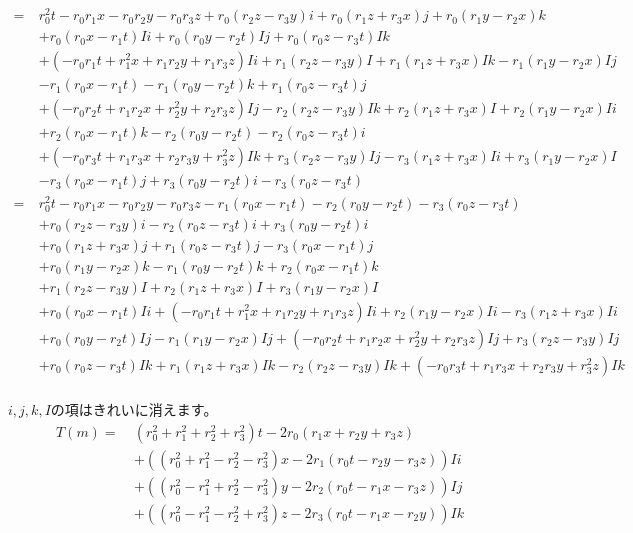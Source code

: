 \documentclass[a4paper,12pt,notitlepage]{jsreport}
\begin{document}
\begin{equation}
  \begin{split}
    =~&r_0^2t-r_0r_1x-r_0r_2y-r_0r_3z+r_0(r_2z-r_3y)i+r_0(r_1z+r_3x)j+r_0(r_1y-r_2x)k\\
    &+r_0(r_0x-r_1t)Ii+r_0(r_0y-r_2t)Ij+r_0(r_0z-r_3t)Ik\\
    &+(-r_0r_1t+r_1^2x+r_1r_2y+r_1r_3z)Ii+r_1(r_2z-r_3y)I+r_1(r_1z+r_3x)Ik-r_1(r_1y-r_2x)Ij\\
    &-r_1(r_0x-r_1t)-r_1(r_0y-r_2t)k+r_1(r_0z-r_3t)j\\
    &+(-r_0r_2t+r_1r_2x+r_2^2y+r_2r_3z)Ij-r_2(r_2z-r_3y)Ik+r_2(r_1z+r_3x)I+r_2(r_1y-r_2x)Ii\\
    &+r_2(r_0x-r_1t)k-r_2(r_0y-r_2t)-r_2(r_0z-r_3t)i\\
    &+(-r_0r_3t+r_1r_3x+r_2r_3y+r_3^2z)Ik+r_3(r_2z-r_3y)Ij-r_3(r_1z+r_3x)Ii+r_3(r_1y-r_2x)I\\
    &-r_3(r_0x-r_1t)j+r_3(r_0y-r_2t)i-r_3(r_0z-r_3t)\\
    =~&r_0^2t-r_0r_1x-r_0r_2y-r_0r_3z-r_1(r_0x-r_1t)-r_2(r_0y-r_2t)-r_3(r_0z-r_3t)\\
    &+r_0(r_2z-r_3y)i-r_2(r_0z-r_3t)i+r_3(r_0y-r_2t)i\\
    &+r_0(r_1z+r_3x)j+r_1(r_0z-r_3t)j-r_3(r_0x-r_1t)j\\
    &+r_0(r_1y-r_2x)k-r_1(r_0y-r_2t)k+r_2(r_0x-r_1t)k\\
    &+r_1(r_2z-r_3y)I+r_2(r_1z+r_3x)I+r_3(r_1y-r_2x)I\\
    &+r_0(r_0x-r_1t)Ii+(-r_0r_1t+r_1^2x+r_1r_2y+r_1r_3z)Ii+r_2(r_1y-r_2x)Ii-r_3(r_1z+r_3x)Ii\\
    &+r_0(r_0y-r_2t)Ij-r_1(r_1y-r_2x)Ij+(-r_0r_2t+r_1r_2x+r_2^2y+r_2r_3z)Ij+r_3(r_2z-r_3y)Ij\\
    &+r_0(r_0z-r_3t)Ik+r_1(r_1z+r_3x)Ik-r_2(r_2z-r_3y)Ik+(-r_0r_3t+r_1r_3x+r_2r_3y+r_3^2z)Ik\\
  \end{split}
\end{equation}

$i,j,k,I$の項はきれいに消えます。
\begin{equation}
  \begin{split}
    T(m)=~&(r_0^2+r_1^2+r_2^2+r_3^2)t-2r_0(r_1x+r_2y+r_3z)\\
    &+((r_0^2+r_1^2-r_2^2-r_3^2)x-2r_1(r_0t-r_2y-r_3z))Ii\\
    &+((r_0^2-r_1^2+r_2^2-r_3^2)y-2r_2(r_0t-r_1x-r_3z))Ij\\
    &+((r_0^2-r_1^2-r_2^2+r_3^2)z-2r_3(r_0t-r_1x-r_2y))Ik
  \end{split}
\end{equation}
\end{document}
